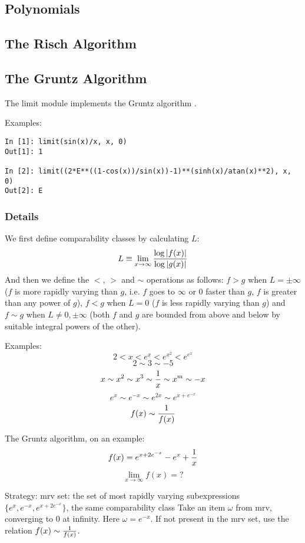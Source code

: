 \subsection{Polynomials}

\subsection{The Risch Algorithm}

\subsection{The Gruntz Algorithm}

The limit module implements the Gruntz algorithm
\cite{gruntz1996computing}.

Examples:
\begin{verbatim}
In [1]: limit(sin(x)/x, x, 0)
Out[1]: 1

In [2]: limit((2*E**((1-cos(x))/sin(x))-1)**(sinh(x)/atan(x)**2), x, 0)
Out[2]: E
\end{verbatim}

\subsubsection{Details}

We first define comparability classes by calculating $L$:
\begin{equation}
L\equiv \lim_{x\to\infty} {\log |f(x)| \over \log |g(x)|}
\end{equation}
And then we define the $<$, $>$ and $\sim$ operations as follows: $f>g$ when
$L=\pm\infty$ ($f$ is more rapidly varying than $g$, i.e. $f$ goes to $\infty$
or $0$ faster than $g$, $f$ is greater than any power of $g$), $f<g$ when $L=0$
($f$ is less rapidly varying than $g$) and $f\sim g$ when $L\neq 0,\pm\infty$
(both $f$ and $g$ are bounded from above and below by suitable integral powers
of the other).

Examples:
$$2 < x < e^x < e^{x^2} < e^{e^x}$$
$$2\sim 3\sim -5$$
$$x\sim x^2\sim x^3\sim {1\over x}\sim x^m\sim -x$$
$$e^x\sim e^{-x}\sim e^{2x}\sim e^{x+e^{-x}}$$
$$f(x)\sim{1\over f(x)}$$

The Gruntz algorithm, on an example:
$$f(x) = e^{x+2e^{-x}} - e^x + {1\over x}$$
$$\lim_{x\to\infty} f(x) = ?$$

Strategy:
mrv set: the set of most rapidly varying subexpressions
$\{e^x, e^{-x}, e^{x+2e^{-x}}\}$, the same comparability class
Take an item $\omega$ from mrv, converging to 0 at infinity. Here
$\omega=e^{-x}$. If not present in the mrv set, use the relation
$f(x)\sim {1\over f(x)}$.


